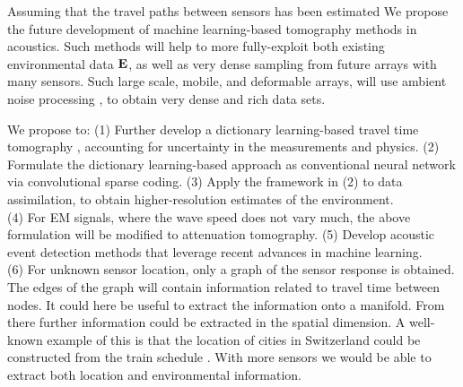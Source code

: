 Assuming that the travel paths between sensors has been estimated\cite{sabra2005,gerstoft2006} We propose the future development of machine learning-based tomography methods in acoustics. Such methods will help to more fully-exploit both existing environmental data $\bf E$, as well as very dense sampling from future arrays with many sensors. Such large scale, mobile, and deformable arrays, will use ambient noise processing \cite{sabra2005}, to obtain very dense and rich data sets. 

We propose  to: 
(1) Further develop a dictionary learning-based travel time tomography \cite{bianco2018}, accounting for uncertainty in the measurements and physics. 
(2) Formulate the dictionary learning-based approach as conventional neural network via convolutional sparse coding. 
(3) Apply the framework in (2) to  data assimilation, to obtain higher-resolution estimates of the environment. \\
(4) For EM signals, where the wave speed does not vary much, the above formulation will be modified to  attenuation tomography.
(5) Develop acoustic event detection methods that leverage recent advances in machine learning.\\
(6) For unknown sensor location, only a graph of the sensor response is obtained. The edges of the graph will contain information related to travel time between nodes. It could here be useful to extract the information onto a manifold. From there further information could be extracted in the spatial dimension. A well-known example of this is that the location of cities in Switzerland could be constructed from the train schedule \cite{dokmanic2015}. With more sensors we would be able to extract both location and environmental information.  

